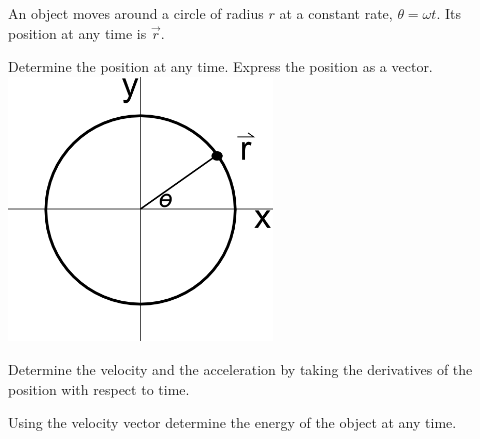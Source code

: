 \begin{problem}
\item An object moves around a circle of radius $r$  at a constant
  rate, $\theta=\omega t$. Its position at any time is $\vec{r}$.

  \begin{subproblem}
  \item Determine the position at any time. Express the position as
    a vector.
     \\
    \includegraphics[width=7cm]{ink/week12/circularMotion}
    \vfill
  \item Determine the velocity and the acceleration by taking the
    derivatives of the position with respect to time.
    \vfill
  \item Using the velocity vector determine the energy of the object
    at any time.
    \vfill
  \end{subproblem}

  \clearpage


\end{problem}
